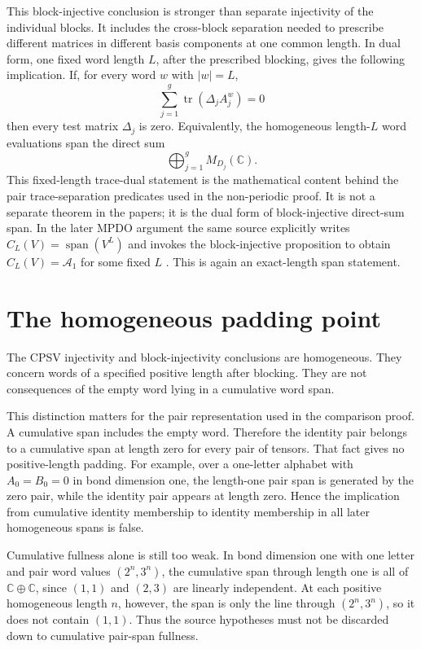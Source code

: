 \documentclass{article}
\begin{document}
This block-injective conclusion is stronger than separate injectivity of the
individual blocks. It includes the cross-block separation needed to prescribe
different matrices in different basis components at one common length. In dual
form, one fixed word length $L$, after the prescribed blocking, gives the
following implication. If, for every word $w$ with $|w|=L$,
\[
  \sum_{j=1}^g \operatorname{tr}(\Delta_j A_j^w)=0
\]
then every test matrix $\Delta_j$ is zero. Equivalently, the homogeneous
length-$L$ word evaluations span the direct sum
\[
  \bigoplus_{j=1}^g M_{D_j}(\mathbb C).
\]
This fixed-length trace-dual statement is the mathematical content behind the
pair trace-separation predicates used in the non-periodic proof. It is not a
separate theorem in the papers; it is the dual form of block-injective
direct-sum span. In the later MPDO argument the same source explicitly writes
$C_L(V)=\operatorname{span}(V^L)$ and invokes the block-injective proposition
to obtain $C_L(V)=\mathcal A_1$ for some fixed $L$
\cite[lines~1984--1988]{Cirac2016MPDO_arXiv}. This is again an exact-length
span statement.

\section{The homogeneous padding point}

The CPSV injectivity and block-injectivity conclusions are homogeneous.
They concern words of a specified positive length after blocking. They are not
consequences of the empty word lying in a cumulative word span.

This distinction matters for the pair representation used in the comparison
proof. A cumulative span includes the empty word. Therefore the identity pair
belongs to a cumulative span at length zero for every pair of tensors. That fact
gives no positive-length padding. For example, over a one-letter alphabet with
$A_0=B_0=0$ in bond dimension one, the length-one pair span is generated by
the zero pair, while the identity pair appears at length zero. Hence the
implication from cumulative identity membership to identity membership in all
later homogeneous spans is false.

Cumulative fullness alone is still too weak. In bond dimension one with one
letter and pair word values $(2^n,3^n)$, the cumulative span through length
one is all of $\mathbb C\oplus\mathbb C$, since $(1,1)$ and $(2,3)$ are
linearly independent. At each positive homogeneous length $n$, however, the
span is only the line through $(2^n,3^n)$, so it does not contain $(1,1)$.
Thus the source hypotheses must not be discarded down to cumulative pair-span
fullness.
\end{document}
